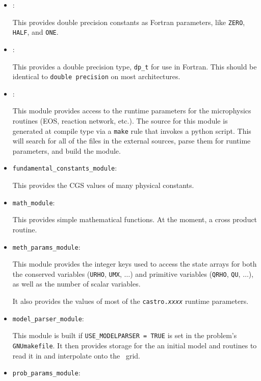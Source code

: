 \begin{itemize}

\item {}:

  This provides double precision constants as Fortran parameters, like 
  {\tt ZERO}, {\tt HALF}, and {\tt ONE}.

\item {}:

  This provides a double precision type, {\tt dp\_t} for use in
  Fortran.  This should be identical to {\tt double precision} on most
  architectures.

\item {}:

  This module provides access to the runtime parameters for the
  microphysics routines (EOS, reaction network, etc.).  The source
  for this module is generated at compile type via a {\tt make} rule
  that invokes a python script.  This will search for all of the 
   files in the external sources, parse them 
  for runtime parameters, and build the module.
  

\item {\tt fundamental\_constants\_module}:

  This provides the CGS values of many physical constants.

\item {\tt math\_module}: 

  This provides simple mathematical functions.  At the moment, a cross
  product routine.

\item {\tt meth\_params\_module}:

  This module provides the integer keys used to access the state
  arrays for both the conserved variables ({\tt URHO}, {\tt UMX}, $\ldots$)
  and primitive variables ({\tt QRHO}, {\tt QU}, $\ldots$), as well
  as the number of scalar variables.

  It also provides the values of most of the {\tt castro.{\em xxxx}}
  runtime parameters.

\item {\tt model\_parser\_module}:

  This module is built if {\tt USE\_MODELPARSER = TRUE} is set in the
  problem's {\tt GNUmakefile}.  It then provides storage for the an
  initial model and routines to read it in and interpolate onto the
  \castro\ grid.

\item {\tt prob\_params\_module}:


\end{itemize}
